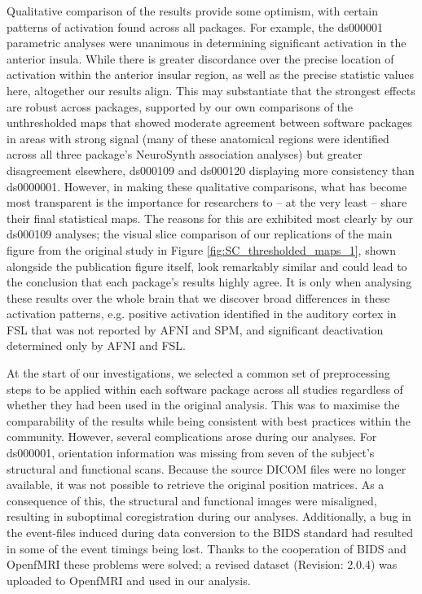 Qualitative comparison of the results provide some optimism, with certain patterns of activation found across all packages. For example, the ds000001 parametric analyses were unanimous in determining significant activation in the anterior insula. While there is greater discordance over the precise location of activation within the anterior insular region, as well as the precise statistic values here, altogether our results align. This may substantiate that the strongest effects are robust across packages, supported by our own comparisons of the unthresholded maps that showed moderate agreement between software packages in areas with strong signal  (many of these anatomical regions were identified across all three package's NeuroSynth association analyses) but greater disagreement elsewhere, ds000109 and ds000120 displaying more consistency than ds0000001. However, in making these qualitative comparisons, what has become most transparent is the importance for researchers to -- at the very least -- share their final statistical maps. The reasons for this are exhibited most clearly by our ds000109 analyses; the visual slice comparison of our replications of the main figure from the original study in Figure \ref{fig:SC_thresholded_maps_1}, shown alongside the publication figure itself, look remarkably similar and could lead to the conclusion that each package's results highly agree. It is only when analysing these results over the whole brain that we discover broad differences in these activation patterns, e.g. positive activation identified in the auditory cortex in FSL that was not reported by AFNI and SPM, and significant deactivation determined only by AFNI and FSL.

At the start of our investigations, we selected a common set of preprocessing steps to be applied within each software package across all studies regardless of whether they had been used in the original analysis. This was to maximise the comparability of the results while being consistent with best practices within the community. However, several complications arose during our analyses. For ds000001, orientation information was missing from seven of the subject's structural and functional scans. Because the source DICOM files were no longer available, it was not possible to retrieve the original position matrices. As a consequence of this, the structural and functional images were misaligned, resulting in suboptimal coregistration during our analyses. Additionally, a bug in the event-files induced during data conversion to the BIDS standard had resulted in some of the event timings being lost. Thanks to the cooperation of BIDS and OpenfMRI these problems were solved; a revised dataset (Revision: 2.0.4) was uploaded to OpenfMRI and used in our analysis. 

